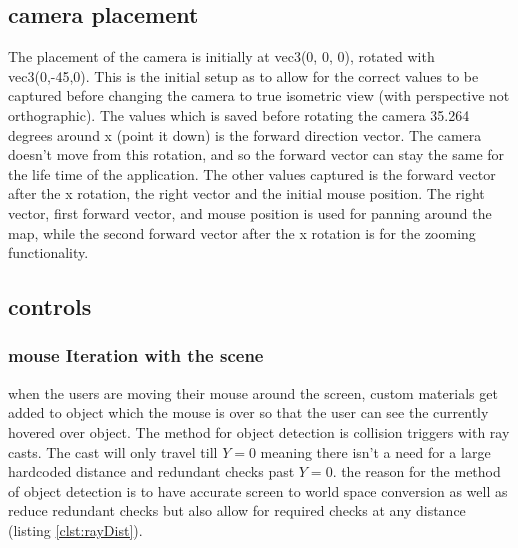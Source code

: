 \subsection{camera placement}
The placement of the camera is initially at vec3(0, 0, 0), rotated with vec3(0,-45,0). This is the initial setup as to allow for the correct values to be captured before changing the camera to true isometric view (with perspective not orthographic). The values which is saved before rotating the camera 35.264 degrees around x (point it down) is the forward direction vector. The camera doesn't move from this rotation, and so the forward vector can stay the same for the life time of the application. The other values captured is the forward vector after the x rotation, the right vector and the initial mouse position. The right vector, first forward vector, and mouse position is used for panning around the map, while the second forward vector after the x rotation is for the zooming functionality.

\subsection{controls}
\subsubsection{mouse Iteration with the scene}
when the users are moving their mouse around the screen, custom materials get added to object which the mouse is over so that the user can see the currently hovered over object. The method for object detection is collision triggers with ray casts. The cast will only travel till $Y=0$ meaning there isn't a need for a large hardcoded distance and redundant checks past $Y=0$. the reason for the method of object detection is to have accurate screen to world space conversion as well as reduce redundant checks but also allow for required checks at any distance (listing \ref{clst:rayDist}).

